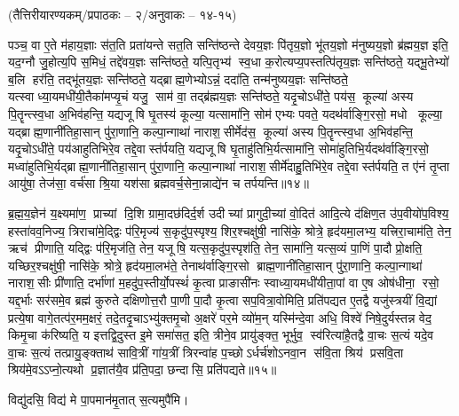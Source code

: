 \vspace{-1ex}
\centerline{\normalsize(तैत्तिरीयारण्यकम्/प्रपाठकः – २/अनुवाकः – १४-१५)}
{\normalsize
पञ्च॒ वा ए॒ते म॑हाय॒ज्ञाः स॑त॒ति प्रता॑यन्ते सत॒ति सन्ति॑ष्ठन्ते देवय॒ज्ञः पि॑तृय॒ज्ञो भू॑तय॒ज्ञो म॑नुष्यय॒ज्ञो ब्र॑ह्मय॒ज्ञ इति॒ यद॒ग्नौ जु॒होत्य॒पि स॒मिधं॒ तद्दे॑वय॒ज्ञः सन्ति॑ष्ठते॒ यत्पि॒तृभ्य॑ स्व॒धा क॒रोत्यप्य॒पस्तत्पि॑तृय॒ज्ञः सन्ति॑ष्ठते॒ यद्भू॒तेभ्यो॑ ब॒लि हर॑ति॒ तद्भू॑तय॒ज्ञः सन्ति॑ष्ठते॒ यद्ब्राह्म॒णेभ्योऽन्नं॒ ददा॑ति॒ तन्म॑नुष्यय॒ज्ञः सन्ति॑ष्ठते॒ यत्स्वाध्या॒यमधी॑यी॒तैका॑मप्यृ॒चं यजु॒ साम॑ वा॒ तद्ब्र॑ह्मय॒ज्ञः सन्ति॑ष्ठते॒ यदृ॒चोऽधी॑ते॒ पय॑स॒ कूल्या॑ अस्य पि॒तॄन्त्स्व॒धा अ॒भिव॑हन्ति॒ यद्यजूषि घृ॒तस्य॑ कूल्या॒ यत्सामा॑नि॒ सोम॑ एभ्यः पवते॒ यदथ॑र्वाङ्गि॒रसो॒ मधो कूल्या॒ यद्ब्राह्म॒णानी॑तिहा॒सान् पु॑रा॒णानि॒ कल्पा॒न्गाथा॑ नाराश॒सीर्मेद॑स॒ कूल्या॑ अस्य पि॒तॄन्त्स्व॒धा अ॒भिव॑हन्ति॒ यदृ॒चोऽधी॑ते॒ पय॑आहुतिभिरे॒व तद्दे॒वास्त॑र्पयति॒ यद्यजूषि घृ॒ताहु॑तिभि॒र्यत्सामा॑नि॒ सोमा॑हुतिभि॒र्यदथ॑र्वाङ्गि॒रसो॒ मध्वा॑\-हुतिभि॒र्यद्ब्राह्म॒णानी॑तिहा॒सान् पु॑रा॒णानि॒ कल्पा॒न्गाथा॑ नाराश॒सीर्मे॑दाहु॒तिभि॑रे॒व तद्दे॒वास्त॑र्पयति॒ त ए॑नं तृ॒प्ता आयु॑षा॒ तेज॑सा॒ वर्च॑सा श्रि॒या यश॑सा ब्रह्मवर्च॒सेना॒न्नाद्ये॑न च तर्पयन्ति॥१४॥

ब्र॒ह्म॒य॒ज्ञेन॑ य॒क्ष्यमा॑ण॒ प्राच्यां दि॒शि ग्रामा॒दछ॑दिर्द॒र्\mbox{}श उदीच्यां प्रागुदी॒च्यां वो॒दित॑ आदि॒त्ये द॑क्षिण॒त उ॑प॒वीयो॑प॒विश्य॒ हस्ता॑वव॒निज्य॒ त्रिराचा॑मे॒द्द्विः प॑रि॒मृज्य॑ स॒कृदु॑प॒स्पृश्य॒ शिर॒श्चक्षु॑षी॒ नासि॑के॒ श्रोत्रे॒ हृद॑यमा॒लभ्य॒ यत्त्रिरा॒चाम॑ति॒ तेन॒ ऋच॑ प्रीणाति॒ यद्द्विः प॑रि॒मृज॑ति॒ तेन॒ यजूषि॒ यत्स॒कृदु॑प॒स्पृश॑ति॒ तेन॒ सामा॑नि॒ यत्स॒व्यं पा॒णिं पा॒दौ प्रो॒क्षति॒ यच्छिर॒श्चक्षु॑षी॒ नासि॑के॒ श्रोत्रे॒ हृद॑यमा॒लभ॑ते॒ तेनाथ॑र्वाङ्गि॒रसो ब्राह्म॒णानी॑तिहा॒सान् पु॑रा॒णानि॒ कल्पा॒न्गाथा॑ नाराश॒सीः प्री॑णाति॒ दर्भा॑णां म॒हदु॑प॒स्तीर्यो॒पस्थं॑ कृ॒त्वा प्राङासी॑नः स्वाध्या॒यमधी॑यीता॒पां वा ए॒ष ओष॑धीना॒ रसो॒ यद्द॒र्भाः सर॑समे॒व ब्रह्म॑ कुरुते दक्षिणोत्त॒रौ पा॒णी पा॒दौ कृ॒त्वा सप॒वित्रा॒वोमिति॒ प्रति॑पद्यत ए॒तद्वै यजु॑स्त्रयीं वि॒द्यां प्रत्ये॒षा वागे॒तत्प॑र॒मम॒क्षरं॒ तदे॒तदृ॒चाऽभ्यु॑क्तमृ॒चो अ॒क्षरे॑ पर॒मे व्यो॑म॒न् यस्मि॑न्दे॒वा अधि॒ विश्वे॑ निषे॒दुर्यस्तन्न वेद॒ किमृ॒चा क॑रिष्यति॒ य इत्तद्वि॒दुस्त इ॒मे समा॑सत॒ इति॒ त्रीने॒व प्रायु॑ङ्क्त॒ भूर्भुव॒ स्व॑रित्या॑है॒तद्वै वा॒चः स॒त्यं यदे॒व वा॒चः स॒त्यं तत्प्रायु॒ङ्क्ताथ॑ सावि॒त्रीं गा॑य॒त्रीं त्रिरन्वा॑ह प॒च्छोऽर्धर्च॑शोऽनवा॒न स॑वि॒ता श्रिय॑ प्रसवि॒ता श्रिय॑मे॒वऽऽप्नो॒त्यथो प्र॒ज्ञात॑यै॒व प्र॑ति॒पदा॒ छन्दासि॒ प्रति॑पद्यते॥१५॥


}

विद्यु॑दसि॒ विद्य॑ मे पा॒पमान॑मृ॒तात् स॒त्यमुपै॑मि।

